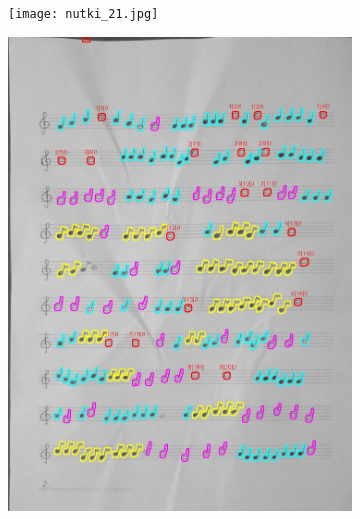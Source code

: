 \documentclass[11pt]{article}
\begin{document}
\begin{figure}[H]
    \centering
    \begin{subfigure}{.5\textwidth}
        \centering
        \graphicspath{ {Resources/} }
        \texttt{[image: nutki\_21.jpg]}
        \label{fig:sub1}
    \end{subfigure}%
    \begin{subfigure}{.5\textwidth}
        \centering
        \graphicspath{ {blobs/} }
        \includegraphics[width=\linewidth]{21_cnts.jpg}
        \label{fig:sub2}
    \end{subfigure}
    \label{fig:test}
\end{figure}
\end{document}
